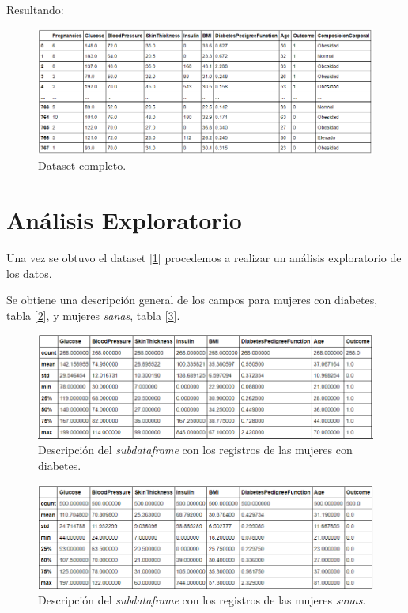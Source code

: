 \documentclass{article}
\begin{document}
Resultando:

\begin{figure}[H]
	\centering
	\includegraphics[width=0.9\linewidth]{dataset_completo.png}
	\caption{Dataset completo.}%
	\label{fig:dataset_completo}
\end{figure}


\section{Análisis Exploratorio}

Una vez se obtuvo el dataset [\ref{fig:dataset_completo}] procedemos a realizar un análisis exploratorio de los datos.

Se obtiene una descripción general de los campos para mujeres con diabetes, tabla [\ref{fig:desc_diabetes}], y mujeres \emph{sanas}, tabla [\ref{fig:desc_sana}].

\begin{figure}[H]
	\centering
	\includegraphics[width=0.9\linewidth]{desc_diabetes.png}
	\caption{Descripción del \emph{subdataframe} con los registros de las mujeres con diabetes.}%
	\label{fig:desc_diabetes}
\end{figure}

\begin{figure}[H]
	\centering
	\includegraphics[width=0.9\linewidth]{desc_sana.png}
	\caption{Descripción del \emph{subdataframe} con los registros de las mujeres \emph{sanas}.}%
	\label{fig:desc_sana}
\end{figure}
\end{document}

